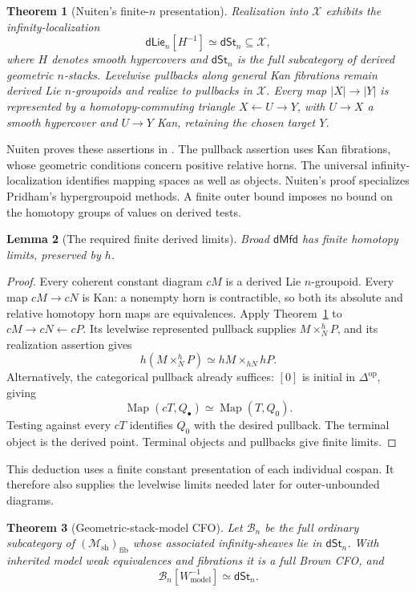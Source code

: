 \documentclass[12pt]{amsart}
\newtheorem{thm}{Theorem}[section]
\newtheorem{lem}[thm]{Lemma}
\theoremstyle{definition}
\theoremstyle{remark}
\numberwithin{equation}{section}
\newcommand{\CM}{\mathcal M}
\newcommand{\dMfd}{\mathsf{dMfd}}
\newcommand{\dLie}{\mathsf{dLie}}
\newcommand{\dSt}{\mathsf{dSt}}
\newcommand{\op}{\mathrm{op}}
\DeclareMathOperator{\Map}{Map}
\begin{document}
\begin{thm}[Nuiten's finite-$n$ presentation]\label{thm:nuiten-derived}
Realization into $\mathcal X$ exhibits the infinity-localization
\[
 \dLie_n[H^{-1}]\simeq\dSt_n\subseteq\mathcal X,
\]
where $H$ denotes smooth hypercovers and $\dSt_n$ is the full
subcategory of derived geometric $n$-stacks.
Levelwise pullbacks along general Kan fibrations remain derived
Lie $n$-groupoids and realize to pullbacks in $\mathcal X$.
Every map $|X|\to|Y|$ is represented by a homotopy-commuting triangle
$X\leftarrow U\to Y$, with $U\to X$ a smooth hypercover and
$U\to Y$ Kan, retaining the chosen target $Y$.
\end{thm}

Nuiten proves these assertions in
\cite[Definition~5.2.14, Proposition~5.2.17,
and Remark~5.2.18, pp.~138--139]{NuitenThesis2018}.
The pullback assertion uses Kan fibrations, whose geometric
conditions concern positive relative horns. The universal
infinity-localization identifies mapping spaces as well as
objects. Nuiten's proof specializes Pridham's hypergroupoid
methods. A finite outer bound imposes no bound on the homotopy groups
of values on derived tests.

\begin{lem}[The required finite derived limits]
\label{lem:derived-finite-limits}
Broad $\dMfd$ has finite homotopy limits, preserved by $h$.
\end{lem}

\begin{proof}
Every coherent constant diagram $cM$ is a derived Lie
$n$-groupoid. Every map $cM\to cN$ is Kan: a nonempty horn is
contractible, so both its absolute and relative homotopy horn
maps are equivalences. Apply Theorem~\ref{thm:nuiten-derived}
to $cM\to cN\leftarrow cP$. Its levelwise represented pullback
supplies $M\times_N^hP$, and its realization assertion gives
\[
 h(M\times_N^hP)\simeq hM\times_{hN}hP.
\]
Alternatively, the categorical pullback already suffices:
$[0]$ is initial in $\Delta^\op$, giving
\[
 \Map(cT,Q_\bullet)\simeq\Map(T,Q_0).
\]
Testing against every $cT$ identifies $Q_0$ with the desired pullback.
The terminal object is the derived point. Terminal objects and
pullbacks give finite limits.
\end{proof}

This deduction uses a finite constant presentation of each
individual cospan. It therefore also supplies the levelwise
limits needed later for outer-unbounded diagrams.

\begin{thm}[Geometric-stack-model CFO]
\label{thm:derived-geometric-cfo}
Let $\mathcal B_n$ be the full ordinary subcategory of
$(\CM_{\mathrm{sh}})_{\mathrm{fib}}$ whose associated
infinity-sheaves lie in $\dSt_n$. With inherited model weak
equivalences and fibrations it is a full Brown CFO, and
\[
 \mathcal B_n[W_{\mathrm{model}}^{-1}]\simeq\dSt_n.
\]
\end{thm}
\end{document}

